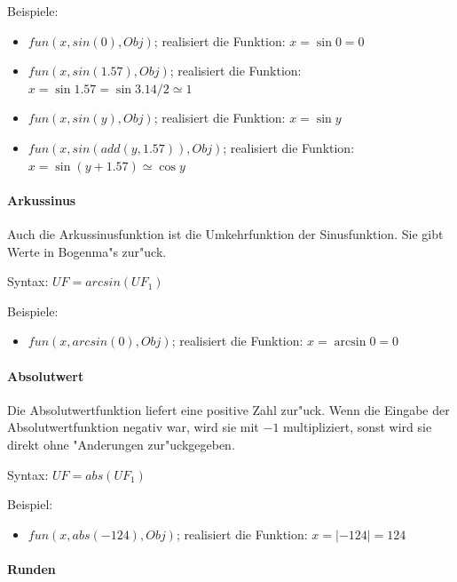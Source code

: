 \bigskip\noindent
Beispiele:
\begin{itemize}
 \item $fun(x, sin(0), Obj)$; realisiert die Funktion: $x=\sin{0}=0$
 \item $fun(x, sin(1.57), Obj)$; realisiert die Funktion: $x=\sin{1.57}=\sin{3.14/2} \simeq 1$
 \item $fun(x, sin(y), Obj)$; realisiert die Funktion: $x=\sin{y}$
 \item $fun(x, sin( add(y, 1.57) ), Obj)$; realisiert die Funktion: $x=\sin{(y + 1.57 )} \simeq \cos{y}$
\end{itemize}


\paragraph{Arkussinus}

Auch die Arkussinusfunktion ist die Umkehrfunktion der Sinusfunktion. Sie gibt Werte in Bogenma"s zur"uck.

\bigskip\noindent
Syntax:
$UF=arcsin( UF_1 )$

\bigskip\noindent
Beispiele:
\begin{itemize}
 \item $fun(x, arcsin(0), Obj)$; realisiert die Funktion: $x=\arcsin{0}=0$
\end{itemize}


\paragraph{Absolutwert}

Die Absolutwertfunktion liefert eine positive Zahl zur"uck. Wenn die Eingabe der Absolutwertfunktion negativ war, wird sie mit $-1$ multipliziert, sonst wird sie direkt ohne "Anderungen zur"uckgegeben.

\bigskip\noindent
Syntax:
$UF=abs( UF_1 )$

\bigskip\noindent
Beispiel:
\begin{itemize}
 \item $fun(x, abs(-124), Obj)$; realisiert die Funktion: $x=|-124|=124$
\end{itemize}


\paragraph{Runden}

